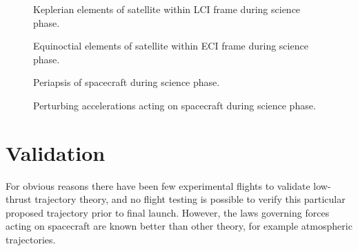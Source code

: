 \begin{figure}
\centering
\def\svgwidth{\figurewidth}

\caption{Keplerian elements of satellite within LCI frame during science phase.} \label{fig:Science-kep-lci}
\end{figure}

\begin{figure}
\centering
\def\svgwidth{\figurewidth}

\caption{Equinoctial elements of satellite within ECI frame during science phase.} \label{fig:Science-mee}
\end{figure}

\begin{figure}
\centering
\def\svgwidth{\figurewidth}

\caption{Periapsis of spacecraft during science phase.} \label{fig:Science-peri}
\end{figure}

\begin{figure}
\centering
\def\svgwidth{\figurewidth}

\caption{Perturbing accelerations acting on spacecraft during science phase.} \label{fig:Science-pert}
\end{figure}

%


\clearpage


\section{Validation} \label{sec:Validation}
For obvious reasons there have been few experimental flights to validate low-thrust trajectory theory, and no flight testing is possible to verify this particular proposed trajectory prior to final launch. However, the laws governing forces acting on spacecraft are known better than other theory, for example atmospheric trajectories. 


